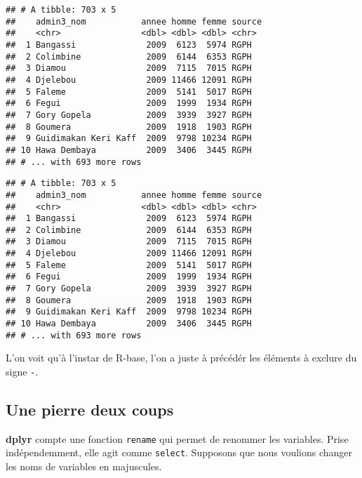 \documentclass[]{book}
\newenvironment{Shaded}{\begin{snugshade}}{\end{snugshade}}
\newcommand{\KeywordTok}[1]{\textcolor[rgb]{0.13,0.29,0.53}{\textbf{#1}}}
\newcommand{\DecValTok}[1]{\textcolor[rgb]{0.00,0.00,0.81}{#1}}
\newcommand{\StringTok}[1]{\textcolor[rgb]{0.31,0.60,0.02}{#1}}
\newcommand{\CommentTok}[1]{\textcolor[rgb]{0.56,0.35,0.01}{\textit{#1}}}
\newcommand{\OperatorTok}[1]{\textcolor[rgb]{0.81,0.36,0.00}{\textbf{#1}}}
\newcommand{\NormalTok}[1]{#1}
\begin{document}
\begin{verbatim}
## # A tibble: 703 x 5
##    admin3_nom           annee homme femme source
##    <chr>                <dbl> <dbl> <dbl> <chr> 
##  1 Bangassi              2009  6123  5974 RGPH  
##  2 Colimbine             2009  6144  6353 RGPH  
##  3 Diamou                2009  7115  7015 RGPH  
##  4 Djelebou              2009 11466 12091 RGPH  
##  5 Faleme                2009  5141  5017 RGPH  
##  6 Fegui                 2009  1999  1934 RGPH  
##  7 Gory Gopela           2009  3939  3927 RGPH  
##  8 Goumera               2009  1918  1903 RGPH  
##  9 Guidimakan Keri Kaff  2009  9798 10234 RGPH  
## 10 Hawa Dembaya          2009  3406  3445 RGPH  
## # ... with 693 more rows
\end{verbatim}

\begin{Shaded}
\end{Shaded}

\begin{verbatim}
## # A tibble: 703 x 5
##    admin3_nom           annee homme femme source
##    <chr>                <dbl> <dbl> <dbl> <chr> 
##  1 Bangassi              2009  6123  5974 RGPH  
##  2 Colimbine             2009  6144  6353 RGPH  
##  3 Diamou                2009  7115  7015 RGPH  
##  4 Djelebou              2009 11466 12091 RGPH  
##  5 Faleme                2009  5141  5017 RGPH  
##  6 Fegui                 2009  1999  1934 RGPH  
##  7 Gory Gopela           2009  3939  3927 RGPH  
##  8 Goumera               2009  1918  1903 RGPH  
##  9 Guidimakan Keri Kaff  2009  9798 10234 RGPH  
## 10 Hawa Dembaya          2009  3406  3445 RGPH  
## # ... with 693 more rows
\end{verbatim}

L'on voit qu'à l'instar de R-base, l'on a juste à précédér les éléments
à exclure du signe \texttt{-}.

\subsection{Une pierre deux coups}\label{une-pierre-deux-coups}

\textbf{dplyr} compte une fonction \texttt{rename} qui permet de
renommer les variables. Prise indépendemment, elle agit comme
\texttt{select}. Supposons que nous voulions changer les noms de
variables en majuscules.
\end{document}
